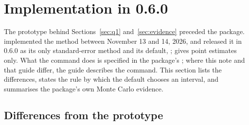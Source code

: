 \section{Implementation in \fevc{} 0.6.0}\label{sec:impl}

The prototype behind Sections~\ref{sec:q1} and~\ref{sec:evidence} preceded the package. \fevc{} implemented the
method between November 13 and 14, 2026, and released it in 0.6.0 as its only standard-error method and its
default, ;  gives point estimates only. What the command does is
specified in the package's ; where this note and that guide differ, the guide
describes the command. This section lists the differences, states the rule by which the default chooses an
interval, and summarises the package's own Monte Carlo evidence.

\subsection{Differences from the prototype}\label{sec:impl-diff}

